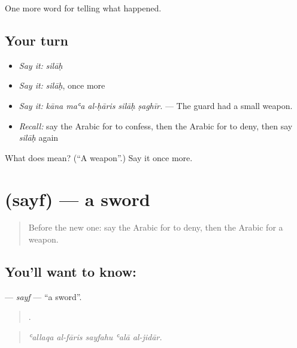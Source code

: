 \begin{grammarlens}[title={What you've built}]
One more word for telling what happened.
\end{grammarlens}

\subsection*{Your turn}
\begin{itemize}
\raggedright
  \item \emph{Say it:} \emph{silāḥ}
  \item \emph{Say it:} \emph{silāḥ}, once more
  \item \emph{Say it:} \emph{kāna maʿa al-ḥāris silāḥ ṣaghīr.} — The guard had a small weapon.
  \item \emph{Recall:} say the Arabic for to confess, then the Arabic for to deny, then say \emph{silāḥ} again
\end{itemize}

\begin{tcolorbox}[breakable,colback=teal!4,colframe=teal!35!black,title={Before you move on}]
What does  mean? (\textquotedblleft{}A weapon\textquotedblright{}.) Say it once more.
\end{tcolorbox}
\section[\texorpdfstring{\ar{سيف} (sayf)}{سيف (sayf)}]{ (sayf) — a sword}

\label{lesson:AR-C326-sayf}



\begin{quote}
Before the new one: say the Arabic for to deny, then the Arabic for a weapon.
\end{quote}

\subsection*{You'll want to know: }
\textbf{} — \emph{sayf} — \textquotedblleft{}a sword\textquotedblright{}.

\begin{quote}
    .
\end{quote}

\begin{quote}
\emph{ʿallaqa al-fāris sayfahu ʿalā al-jidār.}
\end{quote}

